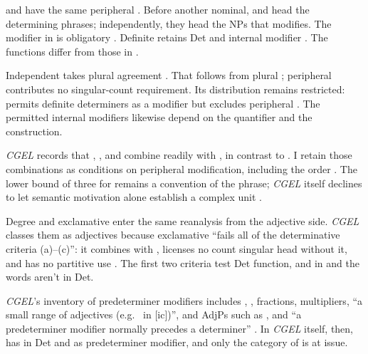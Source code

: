 \documentclass[12pt]{article}
\begin{document}
 and  have the same peripheral . Before another nominal,  and  head the determining phrases; independently, they head the NPs that  modifies. The modifier in  is obligatory \citep[394]{huddleston2002}. Definite  retains Det  and internal modifier  \citep[391]{huddleston2002}. The functions differ from those in .

Independent  takes plural agreement \citep[394]{huddleston2002}. That follows from plural ; peripheral  contributes no singular-count requirement. Its distribution remains restricted:  permits definite determiners as a modifier \citep[392]{huddleston2002} but excludes peripheral . The permitted internal modifiers likewise depend on the quantifier and the construction.

\textit{CGEL} records that , , and  combine readily with , in contrast to  \citep[392]{huddleston2002}. I retain those combinations as conditions on peripheral modification, including the order . The lower bound of three for  \citep[391]{huddleston2002} remains a convention of the phrase; \textit{CGEL} itself declines to let semantic motivation alone establish a complex unit \citep[621]{huddleston2002}.

Degree  and exclamative  enter the same reanalysis from the adjective side. \textit{CGEL} classes them as adjectives because exclamative  \enquote{fails all of the determinative criteria (a)--(c)}: it combines with , licenses no count singular head without it, and has no partitive use \citep[539--540]{huddleston2002}. The first two criteria test Det function, and in  and  the words aren't in Det.

\textit{CGEL}'s inventory of predeterminer modifiers includes , , fractions, multipliers, \enquote{a small range of adjectives (e.g.\  in [ic])}, and AdjPs such as , and \enquote{a predeterminer modifier normally precedes a determiner} \citep[331]{huddleston2002}. In \textit{CGEL} itself, then,  has  in Det and  as predeterminer modifier, and only the category of  is at issue.
\end{document}
